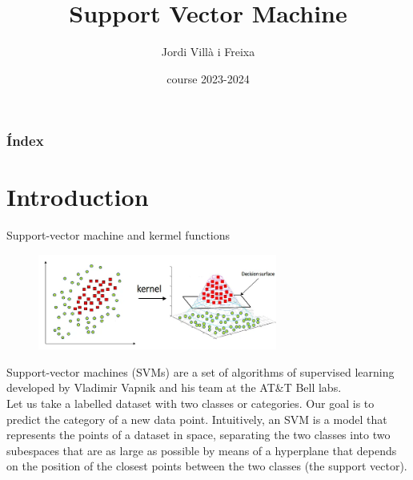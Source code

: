 \documentclass{beamer}
\title[SVM]{Support Vector Machine} %
\author{Jordi Villà i Freixa} %
\institute[FCTE] %
{
Universitat de Vic - Universitat Central de Catalunya \\
Study Abroad\\ %
\medskip
\textit{jordi.villa@uvic.cat} %
}
\date{course 2023-2024}
\begin{document}
\begin{frame}
\titlepage %
\end{frame}

\begin{frame}
\frametitle{Índex} %
\tableofcontents %
\end{frame}



\section{Introduction}

\begin{frame}{Support-vector machine and kermel functions}
  \begin{figure}
    \includegraphics[width=0.7\textwidth]{SVM2}
  \end{figure}
\end{frame}


\begin{frame}
  Support-vector machines (SVMs) are a set of algorithms of supervised learning developed by Vladimir Vapnik and his team at the AT\&T Bell labs.
  \\[10pt]
  Let us take a labelled dataset with two classes or categories. Our goal is to predict the category of a new data point. 
  Intuitively, an SVM is a model that represents the points of a dataset in space, separating the two classes into two subespaces that are as large as possible by means of a hyperplane that depends on the position of the closest points between the two classes (the support vector).
\end{frame}
\end{document}
